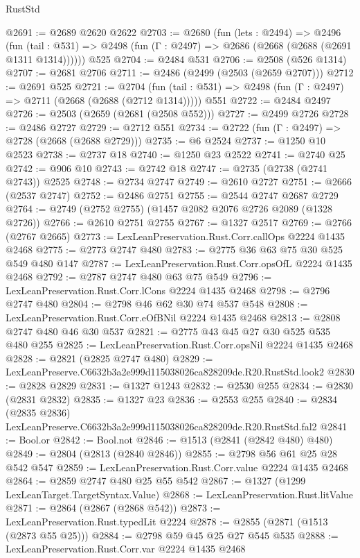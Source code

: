 \begin{lexlean}{RustStd}
\begin{coremodule}
@2691 := @2689 @2620 @2622
@2703 := @2680
    (fun (lets : @2494) =>
    @2496
      (fun (tail : @531) => @2498 (fun (Γ : @2497) => @2686 (@2668 (@2688 (@2691 @1311 @1314))))))
    @525
@2704 := @2484 @531
@2706 := @2508 (@526 @1314)
@2707 := @2681 @2706
@2711 := @2486 (@2499 (@2503 (@2659 @2707)))
@2712 := @2691 @525
@2721 := @2704
    (fun (tail : @531) => @2498 (fun (Γ : @2497) => @2711 (@2668 (@2688 (@2712 @1314)))))
    @551
@2722 := @2484 @2497
@2726 := @2503 (@2659 (@2681 (@2508 @552)))
@2727 := @2499 @2726
@2728 := @2486 @2727
@2729 := @2712 @551
@2734 := @2722 (fun (Γ : @2497) => @2728 (@2668 (@2688 @2729)))
@2735 := @6 @2524
@2737 := @1250 @10 @2523
@2738 := @2737 @18
@2740 := @1250 @23 @2522
@2741 := @2740 @25
@2742 := @906 @10
@2743 := @2742 @18
@2747 := @2735 (@2738 (@2741 @2743)) @2525
@2748 := @2734 @2747
@2749 := @2610 @2727
@2751 := @2666 (@2537 @2747)
@2752 := @2486 @2751
@2755 := @2544 @2747 @2687 @2729
@2764 := @2749 (@2752 @2755) (@1457 @2082 @2076 @2726 @2089 (@1328 @2726))
@2766 := @2610 @2751 @2755
@2767 := @1327 @2517
@2769 := @2766 (@2767 @2665)
@2773 := LexLeanPreservation.Rust.Corr.callOps @2224 @1435 @2468
@2775 := @2773 @2747 @480
@2783 := @2775 @36 @63 @75 @30 @525 @549 @480 @147
@2787 := LexLeanPreservation.Rust.Corr.opsOfL @2224 @1435 @2468
@2792 := @2787 @2747 @480 @63 @75 @549
@2796 := LexLeanPreservation.Rust.Corr.lCons @2224 @1435 @2468
@2798 := @2796 @2747 @480
@2804 := @2798 @46 @62 @30 @74 @537 @548
@2808 := LexLeanPreservation.Rust.Corr.eOfBNil @2224 @1435 @2468
@2813 := @2808 @2747 @480 @46 @30 @537
@2821 := @2775 @43 @45 @27 @30 @525 @535 @480 @255
@2825 := LexLeanPreservation.Rust.Corr.opsNil @2224 @1435 @2468
@2828 := @2821 (@2825 @2747 @480)
@2829 := LexLeanPreserve.C6632b3a2e999d115038026ca828209de.R20.RustStd.look2
@2830 := @2828 @2829
@2831 := @1327 @1243
@2832 := @2530 @255
@2834 := @2830 (@2831 @2832)
@2835 := @1327 @23
@2836 := @2553 @255
@2840 := @2834 (@2835 @2836) LexLeanPreserve.C6632b3a2e999d115038026ca828209de.R20.RustStd.fal2
@2841 := Bool.or
@2842 := Bool.not
@2846 := @1513 (@2841 (@2842 @480) @480)
@2849 := @2804 (@2813 (@2840 @2846))
@2855 := @2798 @56 @61 @25 @28 @542 @547
@2859 := LexLeanPreservation.Rust.Corr.value @2224 @1435 @2468
@2864 := @2859 @2747 @480 @25 @55 @542
@2867 := @1327 (@1299 LexLeanTarget.TargetSyntax.Value)
@2868 := LexLeanPreservation.Rust.litValue
@2871 := @2864 (@2867 (@2868 @542))
@2873 := LexLeanPreservation.Rust.typedLit @2224
@2878 := @2855 (@2871 (@1513 (@2873 @55 @25)))
@2884 := @2798 @59 @45 @25 @27 @545 @535
@2888 := LexLeanPreservation.Rust.Corr.var @2224 @1435 @2468

\end{coremodule}
\end{lexlean}

